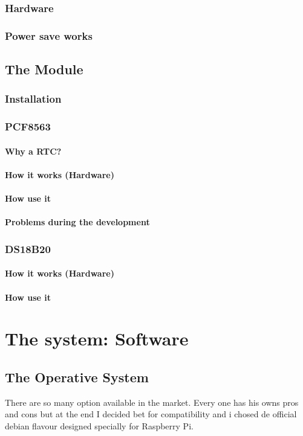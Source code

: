 		\subsection{Hardware}
		\subsection{Power save works}
	\section{The Module}
		\subsection{Installation}
		\subsection{PCF8563}
			\subsubsection{Why a RTC?}
			\subsubsection{How it works (Hardware)}
			\subsubsection{How use it}
			\subsubsection{Problems during the development}
		\subsection{DS18B20}
			\subsubsection{How it works (Hardware)}
			\subsubsection{How use it}
\chapter{The system: Software}
	\section{The Operative System}
	There are so many option available in the market. Every one has his owns pros and cons but at the end I decided bet for compatibility and i chosed de official debian flavour designed specially for Raspberry Pi.
